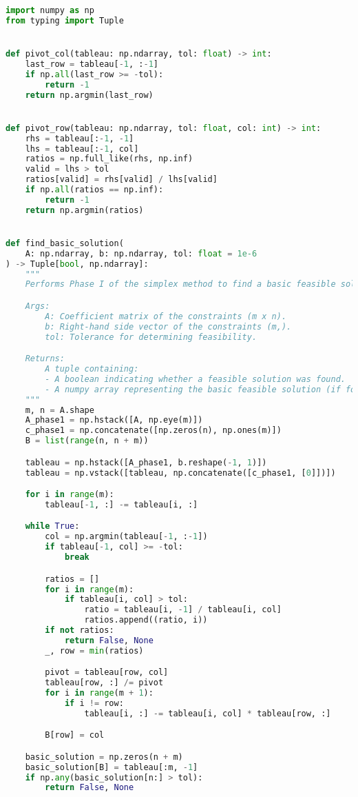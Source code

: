 \documentclass{article}
\begin{document}
\begin{lstlisting}[language=Python]
import numpy as np
from typing import Tuple


def pivot_col(tableau: np.ndarray, tol: float) -> int:
    last_row = tableau[-1, :-1]
    if np.all(last_row >= -tol):
        return -1
    return np.argmin(last_row)


def pivot_row(tableau: np.ndarray, tol: float, col: int) -> int:
    rhs = tableau[:-1, -1]
    lhs = tableau[:-1, col]
    ratios = np.full_like(rhs, np.inf)
    valid = lhs > tol
    ratios[valid] = rhs[valid] / lhs[valid]
    if np.all(ratios == np.inf):
        return -1
    return np.argmin(ratios)


def find_basic_solution(
    A: np.ndarray, b: np.ndarray, tol: float = 1e-6
) -> Tuple[bool, np.ndarray]:
    """
    Performs Phase I of the simplex method to find a basic feasible solution.

    Args:
        A: Coefficient matrix of the constraints (m x n).
        b: Right-hand side vector of the constraints (m,).
        tol: Tolerance for determining feasibility.

    Returns:
        A tuple containing:
        - A boolean indicating whether a feasible solution was found.
        - A numpy array representing the basic feasible solution (if found).
    """
    m, n = A.shape
    A_phase1 = np.hstack([A, np.eye(m)])
    c_phase1 = np.concatenate([np.zeros(n), np.ones(m)])
    B = list(range(n, n + m))

    tableau = np.hstack([A_phase1, b.reshape(-1, 1)])
    tableau = np.vstack([tableau, np.concatenate([c_phase1, [0]])])

    for i in range(m):
        tableau[-1, :] -= tableau[i, :]

    while True:
        col = np.argmin(tableau[-1, :-1])
        if tableau[-1, col] >= -tol:
            break

        ratios = []
        for i in range(m):
            if tableau[i, col] > tol:
                ratio = tableau[i, -1] / tableau[i, col]
                ratios.append((ratio, i))
        if not ratios:
            return False, None
        _, row = min(ratios)

        pivot = tableau[row, col]
        tableau[row, :] /= pivot
        for i in range(m + 1):
            if i != row:
                tableau[i, :] -= tableau[i, col] * tableau[row, :]

        B[row] = col

    basic_solution = np.zeros(n + m)
    basic_solution[B] = tableau[:m, -1]
    if np.any(basic_solution[n:] > tol):
        return False, None


\end{lstlisting}
\end{document}
